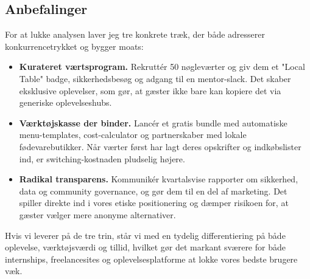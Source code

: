\subsection*{Anbefalinger}
For at lukke analysen laver jeg tre konkrete træk, der både adresserer konkurrencetrykket og bygger moats:
\begin{itemize}
  \item \textbf{Kurateret værtsprogram.} Rekruttér 50 nøgleværter og giv dem et "Local Table" badge, sikkerhedsbesøg og adgang til en mentor-slack. Det skaber eksklusive oplevelser, som gør, at gæster ikke bare kan kopiere det via generiske oplevelseshubs.\citep{Reillier2017}
  \item \textbf{Værktøjskasse der binder.} Lancér et gratis bundle med automatiske menu-templates, cost-calculator og partnerskaber med lokale fødevarebutikker. Når værter først har lagt deres opskrifter og indkøbslister ind, er switching-kostnaden pludselig højere.\citep{FarrellSaloner1986,ShapiroVarian1999}
  \item \textbf{Radikal transparens.} Kommunikér kvartalsvise rapporter om sikkerhed, data og community governance, og gør dem til en del af marketing. Det spiller direkte ind i vores etiske positionering og dæmper risikoen for, at gæster vælger mere anonyme alternativer.\citep{Choudary2016,Zuboff2019}
\end{itemize}
Hvis vi leverer på de tre trin, står vi med en tydelig differentiering på både oplevelse, værktøjsværdi og tillid, hvilket gør det markant sværere for både internships, freelancesites og oplevelsesplatforme at lokke vores bedste brugere væk.
